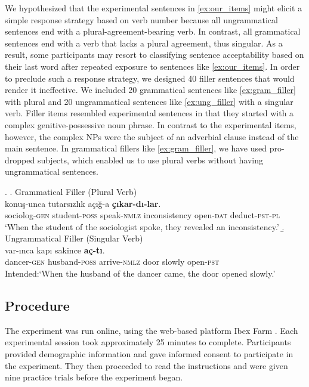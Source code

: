 \documentclass[times,linguex]{glossa}\usepackage[]{graphicx}\usepackage[]{color}
\begin{document}
We hypothesized that the experimental sentences in \ref{ex:our_items} might elicit a simple response strategy based on verb number because all ungrammatical sentences end with a plural-agreement-bearing verb. In contrast, all grammatical sentences end with a verb that lacks a plural agreement, thus singular. As a result, some participants may resort to classifying sentence acceptability based on their last word after repeated exposure to sentences like \ref{ex:our_items}. In order to preclude such a response strategy, we designed 40 filler sentences that would render it ineffective. We included 20 grammatical sentences like \ref{ex:gram_filler} with plural and 20 ungrammatical sentences like \ref{ex:ung_filler} with a singular verb. Filler items resembled experimental sentences in that they started with a complex genitive-possessive noun phrase. In contrast to the experimental items, however, the complex NPs were the subject of an adverbial clause instead of the main sentence. In grammatical fillers like \ref{ex:gram_filler}, we have used pro-dropped subjects, which enabled us to use plural verbs without having ungrammatical sentences. 


\ex. \label{ex:fillers}
  \a. Grammatical Filler (Plural Verb) \label{ex:gram_filler}\\
   konuş-unca tutarsızlık açığ-a \textbf{çıkar-dı-lar}.\\ 
  sociolog-\textsc{gen}  student-\textsc{poss} speak-\textsc{nmlz} inconsistency  open-\textsc{dat} deduct-\textsc{pst}-\textsc{pl}\\
  \glt `When the student of the sociologist spoke, they revealed an inconsistency.'
  \b. Ungrammatical Filler (Singular Verb) \label{ex:ung_filler}\\
   var-ınca kapı sakince \textbf{aç-tı}. \\
  dancer-\textsc{gen}  husband-\textsc{poss} arrive-\textsc{nmlz} door slowly  open-\textsc{pst}\\
  \glt Intended:`When the husband of the dancer came, the door opened slowly.'


\subsection{Procedure}

The experiment was run online, using the web-based platform Ibex Farm \citep{Drummond2013}. Each experimental session took approximately 25 minutes to complete. Participants provided demographic information and gave informed consent to participate in the experiment. They then proceeded to read the instructions and were given nine practice trials before the experiment began.
\end{document}

